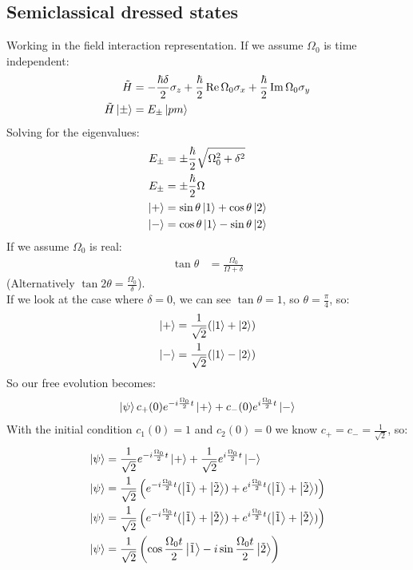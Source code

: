 \subsection{Semiclassical dressed states}
Working in the field interaction representation. If we assume $\Omega_0$ is time independent:
\begin{align*}
	\tilde{H} &= -\frac{\hbar \delta}{2}\sigma_z + \frac{\hbar}{2}\Re \Omega_0 \sigma_x +\frac{\hbar}{2}\Im \Omega_0 \sigma_y \\
	\tilde{H} \ket{\pm} &= E_\pm \ket{pm}
\end{align*}
Solving for the eigenvalues:
\begin{align*}
	E_\pm &= \pm \frac{\hbar}{2}\sqrt{\Omega_0^2 + \delta^2} \\
	E_\pm &= \pm \frac{\hbar}{2}\Omega \\
	\ket{+} &= \sin\theta\ket{1} + \cos\theta \ket{2} \\
	\ket{-} &= \cos\theta\ket{1} - \sin\theta\ket{2}
\end{align*}
If we assume $\Omega_0$ is real:
\begin{align*}
	\tan\theta &= \frac{\Omega_0}{\Omega + \delta}
\end{align*}
(Alternatively $\tan2\theta = \frac{\Omega_0}{\delta}$). \\
If we look at the case where $\delta =0$, we can see $\tan\theta = 1$, so $\theta = \frac{\pi}{4}$, so:
\begin{align*}
	\ket{+} &= \frac{1}{\sqrt{2}} (\ket{1} + \ket{2}) \\
	\ket{-} &= \frac{1}{\sqrt{2}} (\ket{1} - \ket{2})
\end{align*}
So our free evolution becomes:
\begin{align*}
	\ket{\psi} c_+(0) e^{-i\frac{\Omega_0}{2} t}\ket{+} + c_-(0) e^{i\frac{\Omega_0}{2} t} \ket{-}
\end{align*}
With the initial condition $c_1(0) = 1$ and $c_2(0) = 0$ we know $c_+ = c_- = \frac{1}{\sqrt{2}}$, so:
\begin{align*}
	\ket{\psi} &= \frac{1}{\sqrt{2}} e^{-i\frac{\Omega_0}{2} t}\ket{+} + \frac{1}{\sqrt{2}} e^{i\frac{\Omega_0}{2} t} \ket{-} \\
	\ket{\psi} &= \frac{1}{\sqrt{2}} \left(e^{-i\frac{\Omega_0}{2} t}(\ket{\tilde{1}} + \ket{\tilde{2}}) +  e^{i\frac{\Omega_0}{2} t} (\ket{\tilde{1}} + \ket{\tilde{2}})\right) \\
	\ket{\psi} &= \frac{1}{\sqrt{2}} \left(e^{-i\frac{\Omega_0}{2} t}(\ket{\tilde{1}} + \ket{\tilde{2}}) +  e^{i\frac{\Omega_0}{2} t} (\ket{\tilde{1}} + \ket{\tilde{2}})\right) \\
	\ket{\psi} &= \frac{1}{\sqrt{2}}\left(\cos\frac{\Omega_0 t}{2} \ket{\tilde{1}} - i\sin\frac{\Omega_0 t}{2} \ket{\tilde{2}}\right)
\end{align*}
